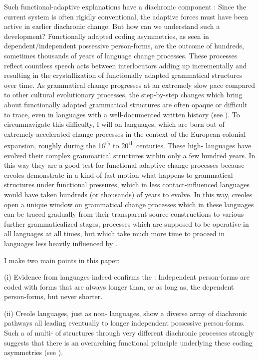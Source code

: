 \documentclass[output=paper]{langsci/langscibook}
\begin{document}
Such functional-adaptive explanations have a diachronic component \citep{Bybee1988}: Since the current system is often rigidly conventional, the adaptive forces must have been active in earlier diachronic change. But how can we understand such a development? Functionally adapted coding asymmetries, as seen in dependent/independent possessive person-forms, are the outcome of hundreds, sometimes thousands of years of language change processes. These processes reflect countless speech acts between interlocutors adding up incrementally and resulting in the crystallization of functionally adapted grammatical structures over time. As grammatical change progresses at an extremely slow pace compared to other cultural evolutionary processes, the step-by-step changes which bring about functionally adapted grammatical structures are often opaque or difficult to trace, even in languages with a well-documented written history (see ). To circumnavigate this difficulty, I will  on  languages, which are born out of extremely accelerated change processes in the context of the European colonial expansion, roughly during the 16\textsuperscript{th} to 20\textsuperscript{th} centuries. These high- languages have evolved their complex grammatical structures within only a few hundred years. In this way they are a good test  for functional-adaptive change processes because creoles demonstrate in a kind of fast motion what happens to grammatical structures under functional pressures, which in less contact-influenced languages would have taken hundreds (or thousands) of years to evolve. In this way, creoles open a unique window on grammatical change processes which in these languages can be traced gradually from their transparent source constructions to various further grammaticalized stages, processes which are supposed to be operative in all languages at all times, but which take much more time to proceed in languages less heavily influenced by . 

I make two main points in this paper:

(i) Evidence from  languages indeed confirms the : Independent person-forms are coded with forms that are always longer than, or as long as, the dependent person-forms, but never shorter.

(ii) Creole languages, just as non- languages, show a diverse array of diachronic pathways all leading eventually to longer independent possessive person-forms. Such a  of multi- of structures through very different diachronic processes strongly suggests that there is an overarching functional  principle underlying these coding asymmetries (see ). 
\end{document}
